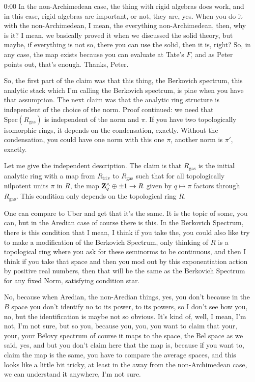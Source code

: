 \begin{unfinished}{0:00}
In the non-Archimedean case, the thing with rigid algebras does work, and in this case, rigid algebras are important, or not, they are, yes. When you do it with the non-Archimedean, I mean, the everything non-Archimedean, then, why is it? I mean, we basically proved it when we discussed the solid theory, but maybe, if everything is not so, there you can use the solid, then it is, right? So, in any case, the map exists because you can evaluate at Tate's $F$, and as Peter points out, that's enough. Thanks, Peter.

So, the first part of the claim was that this thing, the Berkovich spectrum, this analytic stack which I'm calling the Berkovich spectrum, is pine when you have that assumption. The next claim was that the analytic ring structure is independent of the choice of the norm. Proof continued: we need that $\text{Spec}(R_{\text{gas}})$ is independent of the norm and $\pi$. If you have two topologically isomorphic rings, it depends on the condensation, exactly. Without the condensation, you could have one norm with this one $\pi$, another norm is $\pi'$, exactly.

Let me give the independent description. The claim is that $R_{\text{gas}}$ is the initial analytic ring with a map from $R_{\text{triv}}$ to $R_{\text{gas}}$ such that for all topologically nilpotent units $\pi$ in $R$, the map $\mathbf Z_q^\wedge \oplus \pm 1 \to R$ given by $q \mapsto \pi$ factors through $R_{\text{gas}}$. This condition only depends on the topological ring $R$.

One can compare to Uber and get that it's the same. It is the topic of some, you can, but in the Aredian case of course there is this. In the Berkovich Spectrum, there is this condition that I mean, I think if you take the, you could also like try to make a modification of the Berkovich Spectrum, only thinking of $R$ is a topological ring where you ask for these seminorms to be continuous, and then I think if you take that space and then you mod out by this exponentiation action by positive real numbers, then that will be the same as the Berkovich Spectrum for any fixed Norm, satisfying condition star.

No, because when Aredian, the non-Aredian things, yes, you don't because in the $B$ space you don't identify no to its power, to its powers, so I don't see how you, no, but the identification is maybe not so obvious. It's kind of, well, I mean, I'm not, I'm not sure, but so you, because you, you, you want to claim that your, your, your Bëlovy spectrum of course it maps to the space, the Bel space as we said, yes, and but you don't claim here that the map is, because if you want to, claim the map is the same, you have to compare the average spaces, and this looks like a little bit tricky, at least in the away from the non-Archimedean case, we can understand it anywhere, I'm not sure.


\end{unfinished}
